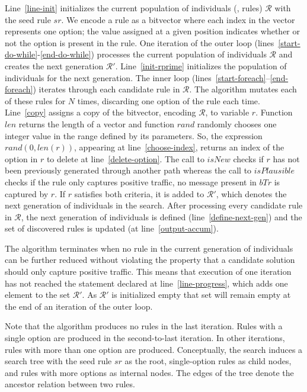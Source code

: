 \documentclass[sigconf,review, anonymous]{acmart}
\begin{document}
Line~\ref{line-init} initializes the current population of individuals
(\ie{}, rules) $\mathcal{R}$ with the seed rule $sr$. We encode a rule
as a bitvector where each index in the vector represents one option;
the value assigned at a given position indicates whether or not the
option is present in the rule. One iteration of the outer loop
(lines~\ref{start-do-while}-\ref{end-do-while}) processes the current
population of individuals $\mathcal R$ and creates the next generation
$\mathcal R'$. Line~\ref{init-rprime} initializes the population of
individuals for the next generation. The inner loop
(lines~\ref{start-foreach}--\ref{end-foreach}) iterates through each
candidate rule in $\mathcal R$. The algorithm mutates each of these
rules for $N$ times, discarding one option of the rule each
time. Line~\ref{copy} assigns a copy of the bitvector, encoding
$\mathcal R$, to variable $r$. Function $\mathit{len}$ returns the
length of a vector and function $\mathit{rand}$ randomly chooses one
integer value in the range defined by its parameters. So, the
expression $\mathit{rand(0, len(r))}$, appearing at
line~\ref{choose-index}, returns an index of the option in $r$ to
delete at line~\ref{delete-option}. The call to $\mathit{isNew}$
checks if $r$ has not been previously generated through another path
whereas the call to $\mathit{isPlausible}$ checks if the rule only
captures positive traffic, \ie{} no message present in $\mathit{bTr}$
is captured by $r$. If $r$ satisfies both criteria, it is added to
$\mathcal R'$, which denotes the next generation of individuals in the
search. After processing every candidate rule in $\mathcal R$, the
next generation of individuals is defined (line~\ref{define-next-gen})
and the set of discovered rules is updated (at
line~\ref{output-accum}).

The algorithm terminates when no rule in the current generation of
individuals can be further reduced without violating the property that
a candidate solution should only capture positive traffic. This means
that execution of one iteration has not reached the statement declared
at line~\ref{line-progress}, which adds one element to the set
$\mathcal{R'}$. As $\mathcal{R'}$ is initialized empty that set will
remain empty at the end of an iteration of the outer loop.

Note that the algorithm produces no rules in the last iteration. Rules
with a single option are produced in the second-to-last iteration. In
other iterations, rules with more than one option are
produced. Conceptually, the search induces a search tree with the seed
rule $sr$ as the root, single-option rules as child nodes, and rules
with more options as internal nodes. The edges of the tree denote the
ancestor relation between two rules.
\end{document}

